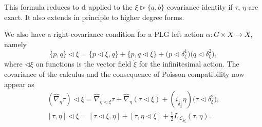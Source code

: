 \documentclass[pdftex]{sigma}
\numberwithin{equation}{section}
\newcommand{\<}{{\langle}}
\renewcommand{\>}{{\rangle}}
\newcommand{\CL}{{\mathcal{L}}}
\newcommand{\extd}{{\rm d}}
\newcommand{\la}{{\triangleright}}
\newcommand{\ra}{{\triangleleft}}
\newcommand{\tilder}{\grave}
\begin{document}
This formula reduces to $\extd$ applied to the $\xi\la\{a,b\}$ covariance identity if $\tau$, $\eta$ are exact. It also extends in principle to higher degree forms.

\begin{Remark}\label{RemarkPLGactright} We also have a right-covariance condition for a PLG left action $\alpha\colon G\times X\to X$, namely
\begin{equation*}%
\lbrace p,q\rbrace\ra\xi=\lbrace p\ra\xi,q\rbrace+\lbrace p,q\ra\xi\rbrace+\big(p\ra\delta_\xi^1\big)\big(q\ra\delta_\xi^2\big),
\end{equation*}
where $\ra\xi$ on functions is the vector field $\tilder\xi$ for the infinitesimal action. The covariance of the calculus and the consequence of Poisson-compatibility now appear as
\begin{gather*} (\hat{\nabla}_{\eta}\tau)\ra\xi=\hat{\nabla}_{\eta\ra\xi}\tau +\hat{\nabla}_{\eta}(\tau\ra\xi)+(i_{\tilder{\delta_\xi^1}}\eta)\big(\tau\ra\delta_\xi^2\big),\\
 [\tau,\eta]\ra\xi=[\tau\ra\xi,\eta]+[\tau,\eta\ra\xi]+\tfrac{1}{2} L_{\CL_{\tilder{\delta \xi}}}(\tau,\eta).
 \end{gather*}
\end{Remark}
\end{document}

